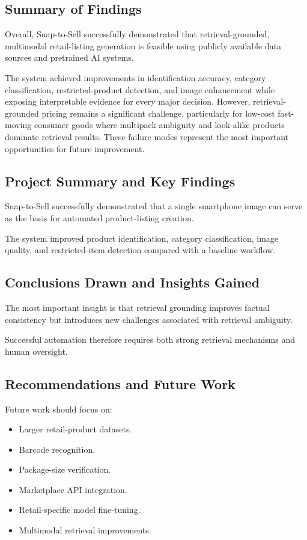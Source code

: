 \documentclass[conference]{IEEEtran}
\begin{document}
\subsection{Summary of Findings}

Overall, Snap-to-Sell successfully demonstrated that retrieval-grounded,
multimodal retail-listing generation is feasible using publicly available
data sources and pretrained AI systems.

The system achieved improvements in identification accuracy,
category classification,
restricted-product detection,
and image enhancement while exposing interpretable evidence for every major
decision. However, retrieval-grounded pricing remains a significant challenge,
particularly for low-cost fast-moving consumer goods where multipack ambiguity
and look-alike products dominate retrieval results. These failure modes
represent the most important opportunities for future improvement. 


\subsection{Project Summary and Key Findings}

Snap-to-Sell successfully demonstrated that a single smartphone image can serve as the basis for automated product-listing creation.

The system improved product identification, category classification, image quality, and restricted-item detection compared with a baseline workflow.

\subsection{Conclusions Drawn and Insights Gained}

The most important insight is that retrieval grounding improves factual consistency but introduces new challenges associated with retrieval ambiguity.

Successful automation therefore requires both strong retrieval mechanisms and human oversight.

\subsection{Recommendations and Future Work}

Future work should focus on:

\begin{itemize}
\item Larger retail-product datasets.
\item Barcode recognition.
\item Package-size verification.
\item Marketplace API integration.
\item Retail-specific model fine-tuning.
\item Multimodal retrieval improvements.
\end{itemize}
\end{document}
